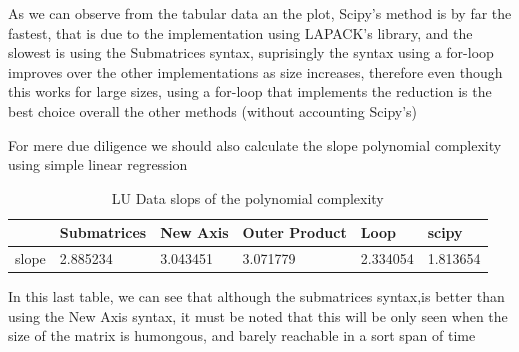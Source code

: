 As we can observe from the tabular data an the plot, Scipy's method is by far the fastest, that is due to the implementation using LAPACK's library, and the slowest is using the Submatrices syntax, suprisingly the syntax using a for-loop improves over the other implementations as size increases, therefore even though this works for large sizes, using a for-loop that implements the reduction is the best choice overall the other methods (without accounting Scipy's) 

For mere due diligence we should also calculate the slope polynomial complexity using simple linear regression
\begin{table}[H]
    \centering
    \begin{tabular}{|l|l|l|l|l|l|}
    \hline
        \textbf{} & \textbf{Submatrices} & \textbf{New Axis} & \textbf{Outer Product} & \textbf{Loop} & \textbf{scipy} \\ \hline
        slope & 2.885234 & 3.043451 & 3.071779 & 2.334054 & 1.813654 \\ \hline
    \end{tabular}
    \caption{LU Data slops of the polynomial complexity}
\end{table}
In this last table, we can see that although the submatrices syntax,is better than using the New Axis syntax, it must be noted that this will be only seen when the size of the matrix is humongous, and barely reachable in a sort span of time